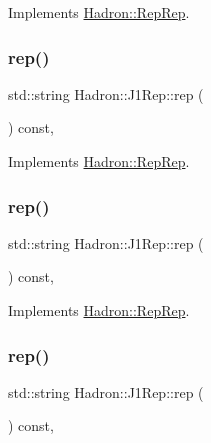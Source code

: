 Implements \mbox{\hyperlink{structHadron_1_1RepRep_ab3213025f6de249f7095892109575fde}{Hadron\+::\+Rep\+Rep}}.

\mbox{\label{structHadron_1_1J1Rep_af725f8ff10c84cda5410728ce30697da}} 
\subsubsection{\texorpdfstring{rep()}{rep()}\hspace{0.1cm}{\footnotesize\ttfamily [2/5]}}
{\footnotesize\ttfamily std\+::string Hadron\+::\+J1\+Rep\+::rep (\begin{DoxyParamCaption}{ }\end{DoxyParamCaption}) const\hspace{0.3cm}{\ttfamily [inline]}, {\ttfamily [virtual]}}



Implements \mbox{\hyperlink{structHadron_1_1RepRep_ab3213025f6de249f7095892109575fde}{Hadron\+::\+Rep\+Rep}}.

\mbox{\label{structHadron_1_1J1Rep_af725f8ff10c84cda5410728ce30697da}} 
\subsubsection{\texorpdfstring{rep()}{rep()}\hspace{0.1cm}{\footnotesize\ttfamily [3/5]}}
{\footnotesize\ttfamily std\+::string Hadron\+::\+J1\+Rep\+::rep (\begin{DoxyParamCaption}{ }\end{DoxyParamCaption}) const\hspace{0.3cm}{\ttfamily [inline]}, {\ttfamily [virtual]}}



Implements \mbox{\hyperlink{structHadron_1_1RepRep_ab3213025f6de249f7095892109575fde}{Hadron\+::\+Rep\+Rep}}.

\mbox{\label{structHadron_1_1J1Rep_af725f8ff10c84cda5410728ce30697da}} 
\subsubsection{\texorpdfstring{rep()}{rep()}\hspace{0.1cm}{\footnotesize\ttfamily [4/5]}}
{\footnotesize\ttfamily std\+::string Hadron\+::\+J1\+Rep\+::rep (\begin{DoxyParamCaption}{ }\end{DoxyParamCaption}) const\hspace{0.3cm}{\ttfamily [inline]}, {\ttfamily [virtual]}}



